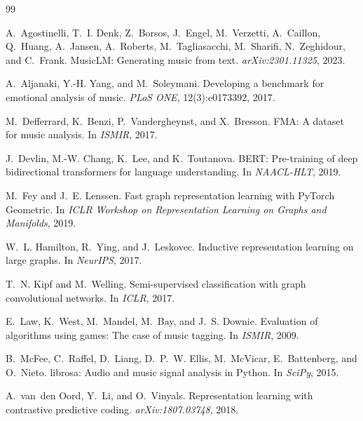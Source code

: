 \documentclass{article}
\begin{document}

\begin{thebibliography}{99}

A.~Agostinelli, T.~I. Denk, Z.~Borsos, J.~Engel, M.~Verzetti, A.~Caillon, Q.~Huang,
A.~Jansen, A.~Roberts, M.~Tagliasacchi, M.~Sharifi, N.~Zeghidour, and C.~Frank.
\newblock MusicLM: Generating music from text.
\newblock \emph{arXiv:2301.11325}, 2023.

A.~Aljanaki, Y.-H. Yang, and M.~Soleymani.
\newblock Developing a benchmark for emotional analysis of music.
\newblock \emph{PLoS ONE}, 12(3):e0173392, 2017.

M.~Defferrard, K.~Benzi, P.~Vandergheynst, and X.~Bresson.
\newblock FMA: A dataset for music analysis.
\newblock In \emph{ISMIR}, 2017.

J.~Devlin, M.-W. Chang, K.~Lee, and K.~Toutanova.
\newblock BERT: Pre-training of deep bidirectional transformers for language
understanding.
\newblock In \emph{NAACL-HLT}, 2019.

M.~Fey and J.~E. Lenssen.
\newblock Fast graph representation learning with PyTorch Geometric.
\newblock In \emph{ICLR Workshop on Representation Learning on Graphs and
Manifolds}, 2019.

W.~L. Hamilton, R.~Ying, and J.~Leskovec.
\newblock Inductive representation learning on large graphs.
\newblock In \emph{NeurIPS}, 2017.

T.~N. Kipf and M.~Welling.
\newblock Semi-supervised classification with graph convolutional networks.
\newblock In \emph{ICLR}, 2017.

E.~Law, K.~West, M.~Mandel, M.~Bay, and J.~S. Downie.
\newblock Evaluation of algorithms using games: The case of music tagging.
\newblock In \emph{ISMIR}, 2009.

B.~McFee, C.~Raffel, D.~Liang, D.~P.~W. Ellis, M.~McVicar, E.~Battenberg, and
O.~Nieto.
\newblock librosa: Audio and music signal analysis in Python.
\newblock In \emph{SciPy}, 2015.

A.~van~den Oord, Y.~Li, and O.~Vinyals.
\newblock Representation learning with contrastive predictive coding.
\newblock \emph{arXiv:1807.03748}, 2018.


\end{thebibliography}
\end{document}
